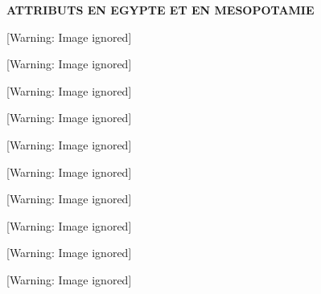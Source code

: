 \documentclass[a4paper,10pt]{article}
\title{}
\author{Florence}
\date{2012-07-11}
\begin{document}
\textbf{ATTRIBUTS EN EGYPTE ET EN MESOPOTAMIE}

\begin{center}
 [Warning: Image ignored] %

\end{center}
\begin{center}
 [Warning: Image ignored] %

\end{center}
\begin{center}
 [Warning: Image ignored] %

\end{center}
\begin{center}
 [Warning: Image ignored] %

\end{center}
\begin{center}
 [Warning: Image ignored] %

\end{center}
\begin{center}
 [Warning: Image ignored] %

\end{center}
\begin{center}
 [Warning: Image ignored] %

\end{center}
\begin{center}
 [Warning: Image ignored] %

\end{center}
\begin{center}
 [Warning: Image ignored] %

\end{center}
\begin{center}
 [Warning: Image ignored] %

\end{center}
\end{document}
